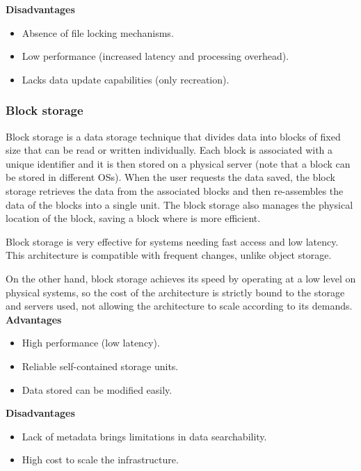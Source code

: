 \noindent\textbf{Disadvantages}
\begin{itemize}
    \item Absence of file locking mechanisms.
    \item Low performance (increased latency and processing overhead).
    \item Lacks data update capabilities (only recreation).
\end{itemize}

\subsubsection*{Block storage}

Block storage is a data storage technique that divides data into blocks of fixed size that can be read or written individually. Each block is associated with a unique identifier and it is then stored on a physical server (note that a block can be stored in different \glspl{OS}). When the user requests the data saved, the block storage retrieves the data from the associated blocks and then re-assembles the data of the blocks into a single unit. The block storage also manages the physical location of the block, saving a block where is more efficient.

Block storage is very effective for systems needing fast access and low latency. This architecture is compatible with frequent changes, unlike object storage.

On the other hand, block storage achieves its speed by operating at a low level on physical systems, so the cost of the architecture is strictly bound to the storage and servers used, not allowing the architecture to scale according to its demands. \\[3mm]
\noindent\textbf{Advantages}
\begin{itemize}
    \item High performance (low latency).
    \item Reliable self-contained storage units.
    \item Data stored can be modified easily.
\end{itemize}

\noindent\textbf{Disadvantages}
\begin{itemize}
    \item Lack of metadata brings limitations in data searchability.
    \item High cost to scale the infrastructure.
\end{itemize}

